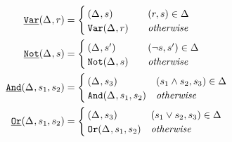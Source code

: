 \newcommand{\wrappedprimspacer}{\mbox{\hspace{1.8cm}} & \\[-3ex]}
\centering
\begin{align*}
\pwrap{\pspawn}(\aStore{},r) &=
  \begin{cases}
    \wrappedprimspacer
    (\aStore{},s) & (r,s) \in \aStore{} \\
    \pspawn(\aStore{},r) & \mathit{otherwise}
  \end{cases} \\
\pwrap{\pnot}(\aStore{},s) &=
  \begin{cases}
    \wrappedprimspacer
    (\aStore{},s') & (\neg s, s') \in \aStore{} \\
    \pnot(\aStore{},s) & \mathit{otherwise}
  \end{cases} \\
\pwrap{\pand}(\aStore{},s_1,s_2) &=
  \begin{cases}
    \wrappedprimspacer
    (\aStore{},s_3) & (s_1 \wedge s_2, s_3) \in \aStore{} \\
    \pand(\aStore{},s_1,s_2) & \mathit{otherwise}
  \end{cases} \\
\pwrap{\por}(\aStore{},s_1,s_2) &=
  \begin{cases}
    \wrappedprimspacer
    (\aStore{},s_3) & (s_1 \vee s_2, s_3) \in \aStore{} \\
    \por(\aStore{},s_1,s_2) & \mathit{otherwise}
  \end{cases}
\end{align*}
